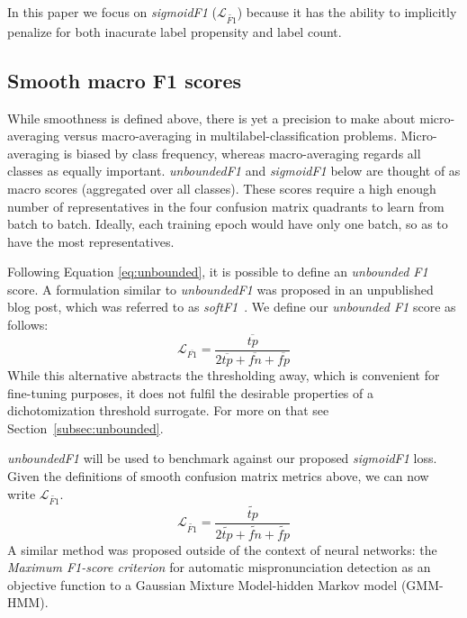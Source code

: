 In this paper we focus on \emph{sigmoidF1} ($\mathcal{L}_{\widetilde{\mathit{F1}}}$) because it has the ability to implicitly penalize for both inacurate label propensity and label count.


\subsection{Smooth macro F1 scores}
\label{sec:orgc5d29d7}

While smoothness is defined above, there is yet a precision to make about micro-averaging versus macro-averaging in multilabel-classification problems. Micro-averaging is biased by class frequency, whereas macro-averaging regards all classes as equally important. \emph{unboundedF1} and \emph{sigmoidF1} below are thought of as macro scores (aggregated over all classes). These scores require a high enough number of representatives in the four confusion matrix quadrants to learn from batch to batch. Ideally, each training epoch would have only one batch, so as to have the most representatives.

Following Equation \ref{eq:unbounded}, it is possible to define an \emph{unbounded F1} score. A formulation similar to \emph{unboundedF1} was proposed in an unpublished blog post, which was referred to as \emph{softF1}~\cite{softF1}. We define our \emph{unbounded F1} score as follows:
%
\begin{equation}
\mathcal{L}_{\overline{\mathit{F1}}}= \frac{\overline{tp}}{2 \overline{tp}+ \overline{fn}+ \overline{fp}}
\end{equation}
\label{eq:unboundedF1}
%
While this alternative abstracts the thresholding away, which is convenient for fine-tuning purposes, it does not fulfil the desirable properties of a dichotomization threshold surrogate. For more on that see Section~\ref{subsec:unbounded}.

\emph{unboundedF1} will be used to benchmark against our proposed \emph{sigmoidF1} loss. Given the definitions of smooth confusion matrix metrics above, we can now write $\mathcal{L}_{\widetilde{\mathit{F1}}}$.
%
\begin{equation}\label{eq:sigmoidF1}
\mathcal{L}_{\widetilde{\mathit{F1}}}= \frac{\widetilde{\mathit{tp}}}{2 \widetilde{\mathit{tp}}+ \widetilde{\mathit{fn}}+ \widetilde{\mathit{fp}}}
\end{equation}
%
A similar method was proposed outside of the context of neural networks: the \emph{Maximum F1-score criterion} for automatic mispronunciation detection as an objective function to a Gaussian Mixture Model-hidden Markov model (GMM-HMM)\cite{sigmoid}.

